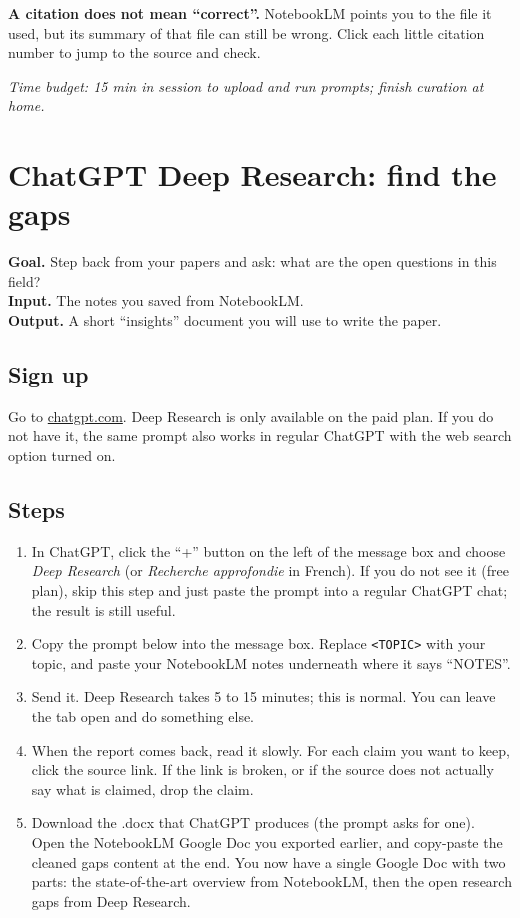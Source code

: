 \documentclass[11pt,a4paper]{article}
\begin{document}
\begin{watchout}
\textbf{A citation does not mean ``correct''.} NotebookLM points you to the file it used, but its summary of that file can still be wrong. Click each little citation number to jump to the source and check.
\end{watchout}

\textit{Time budget: 15 min in session to upload and run prompts; finish curation at home.}

\section{ChatGPT Deep Research: find the gaps}
\label{sec:cgdr}

\begin{toolheader}
\textbf{Goal.} Step back from your papers and ask: what are the open questions in this field?\\
\textbf{Input.} The notes you saved from NotebookLM.\\
\textbf{Output.} A short ``insights'' document you will use to write the paper.
\end{toolheader}

\subsection*{Sign up}
Go to \href{https://chatgpt.com/}{chatgpt.com}. Deep Research is only available on the paid plan. If you do not have it, the same prompt also works in regular ChatGPT with the web search option turned on.

\subsection*{Steps}
\begin{enumerate}[leftmargin=*, itemsep=2pt]
  \item In ChatGPT, click the ``+'' button on the left of the message box and choose \emph{Deep Research} (or \emph{Recherche approfondie} in French). If you do not see it (free plan), skip this step and just paste the prompt into a regular ChatGPT chat; the result is still useful.
  \item Copy the prompt below into the message box. Replace \texttt{<TOPIC>} with your topic, and paste your NotebookLM notes underneath where it says ``NOTES''.
  \item Send it. Deep Research takes 5 to 15 minutes; this is normal. You can leave the tab open and do something else.
  \item When the report comes back, read it slowly. For each claim you want to keep, click the source link. If the link is broken, or if the source does not actually say what is claimed, drop the claim.
  \item Download the .docx that ChatGPT produces (the prompt asks for one). Open the NotebookLM Google Doc you exported earlier, and copy-paste the cleaned gaps content at the end. You now have a single Google Doc with two parts: the state-of-the-art overview from NotebookLM, then the open research gaps from Deep Research.
\end{enumerate}
\end{document}
